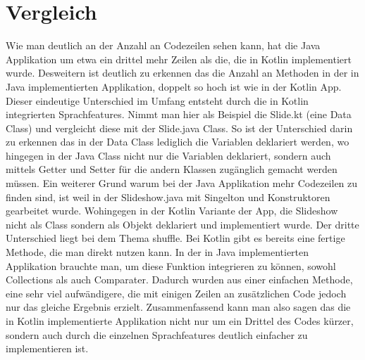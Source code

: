 \documentclass{sigchi-ext}
\begin{document}
\section{Vergleich}
Wie man deutlich an der Anzahl an Codezeilen sehen kann, hat die Java Applikation um etwa ein drittel mehr Zeilen als die, die in Kotlin implementiert wurde. Desweitern ist deutlich zu erkennen das die Anzahl an Methoden in der in Java implementierten Applikation, doppelt so hoch ist wie in der Kotlin App.
Dieser eindeutige Unterschied im Umfang entsteht durch die in Kotlin integrierten Sprachfeatures. Nimmt man hier als Beispiel die Slide.kt (eine Data Class) und vergleicht diese mit der Slide.java Class. So ist der Unterschied darin zu erkennen das in der Data Class lediglich die Variablen deklariert werden, wo hingegen in der Java Class nicht nur die Variablen deklariert, sondern auch mittels Getter und Setter für die andern Klassen zugänglich gemacht werden müssen.
Ein weiterer Grund warum bei der Java Applikation mehr Codezeilen zu finden sind, ist weil in der Slideshow.java mit Singelton und Konstruktoren gearbeitet wurde. Wohingegen in der Kotlin Variante der App, die Slideshow nicht als Class sondern als Objekt deklariert und implementiert wurde.
Der dritte Unterschied liegt bei dem Thema shuffle. Bei Kotlin gibt es bereits eine fertige Methode, die man direkt nutzen kann. In der in Java implementierten Applikation brauchte man, um diese Funktion integrieren zu können, sowohl Collections als auch Comparater. Dadurch wurden aus einer einfachen Methode, eine sehr viel aufwändigere, die mit einigen Zeilen an zusätzlichen Code jedoch nur das gleiche Ergebnis erzielt.
Zusammenfassend kann man also sagen das die in Kotlin implementierte Applikation nicht nur um ein Drittel des Codes kürzer, sondern auch durch die einzelnen Sprachfeatures deutlich einfacher zu implementieren ist.


\balance{} 



\end{document}
